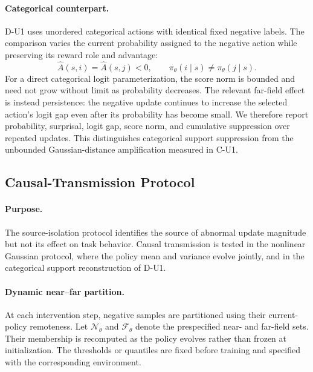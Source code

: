 \documentclass{article}
\theoremstyle{plain}
\theoremstyle{definition}
\theoremstyle{remark}
\begin{document}
\paragraph{Categorical counterpart.}
D-U1 uses unordered categorical actions with identical fixed negative
labels. The comparison varies the current probability assigned to the
negative action while preserving its reward role and advantage:
\begin{equation}
    \widehat A(s,i)
    =
    \widehat A(s,j)
    <0,
    \qquad
    \pi_\theta(i\mid s)
    \neq
    \pi_\theta(j\mid s).
    \label{eq:categorical_source_match}
\end{equation}
For a direct categorical logit parameterization, the score norm is
bounded and need not grow without limit as probability decreases.
The relevant far-field effect is instead persistence: the negative
update continues to increase the selected action's logit gap even after
its probability has become small. We therefore report probability,
surprisal, logit gap, score norm, and cumulative suppression over
repeated updates. This distinguishes categorical support suppression
from the unbounded Gaussian-distance amplification measured in C-U1.


\subsection{Causal-Transmission Protocol}
\label{app:causal_transmission_protocol}

\paragraph{Purpose.}
The source-isolation protocol identifies the source of abnormal update
magnitude but not its effect on task behavior. Causal transmission is tested in the nonlinear
Gaussian protocol, where the policy mean and variance evolve jointly,
and in the categorical support reconstruction of D-U1.

\paragraph{Dynamic near--far partition.}
At each intervention step, negative samples are partitioned using their
current-policy remoteness. Let
$\mathcal N_\theta$
and
$\mathcal F_\theta$
denote the prespecified near- and far-field sets. Their membership is
recomputed as the policy evolves rather than frozen at initialization.
The thresholds or quantiles are fixed before training and specified with the
corresponding environment.
\end{document}

